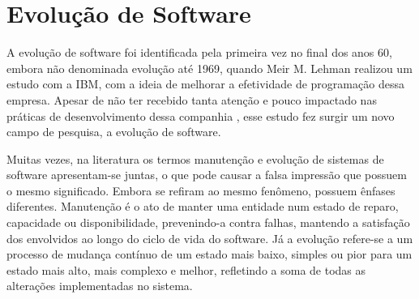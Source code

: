 \section{Evolução de Software}

A evolução de software foi identificada pela primeira vez no final dos anos 60, embora não denominada evolução até 1969, quando Meir M. Lehman realizou um estudo com a IBM, com a ideia de melhorar a efetividade de programação dessa empresa. Apesar de não ter recebido tanta atenção e pouco impactado nas práticas de desenvolvimento dessa companhia , esse estudo fez surgir um novo campo de pesquisa, a evolução de software.

\begin{mdframed}
Muitas vezes, na literatura os termos manutenção e evolução de sistemas de software apresentam-se juntas, o que pode causar a falsa impressão que possuem o mesmo significado. Embora se refiram ao mesmo fenômeno, possuem ênfases diferentes. Manutenção é o ato de manter uma entidade num estado de reparo, capacidade ou disponibilidade, prevenindo-a contra falhas, mantendo a satisfação dos envolvidos ao longo do ciclo de vida do software. Já a evolução refere-se a um processo de mudança contínuo de um estado mais baixo, simples ou pior para um estado mais alto, mais complexo e melhor, refletindo a soma de todas as alterações implementadas no sistema.
\end{mdframed}

